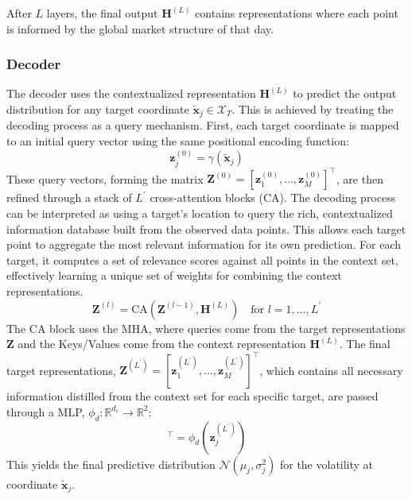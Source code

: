 \documentclass[authoryear,preprint,review,12pt]{elsarticle}
\begin{document}
After \(L\) layers, the final output \(\mathbf{H}^{(L)}\) contains representations where each point is informed by the global market structure of that day. 


\subsubsection{Decoder}
The decoder uses the contextualized representation \(\mathbf{H}^{(L)}\) to predict the output distribution for any target coordinate \(\tilde{\mathbf{x}}_j \in \mathcal{X}_T\). This is achieved by treating the decoding process as a query mechanism. First, each target coordinate is mapped to an initial query vector using the same positional encoding function:
\begin{equation}
    \mathbf{z}_j^{(0)} = \gamma(\tilde{\mathbf{x}}_j)
    \label{eq:initial_target_repr}
\end{equation}
These query vectors, forming the matrix \(\mathbf{Z}^{(0)}=\left[\mathbf{z}_1^{(0)},\dots,\mathbf{z}_M^{(0)}\right]^\intercal\), are then refined through a stack of \(L^\prime\) cross-attention blocks (\(\text{CA}\)). The decoding process can be interpreted as using a target's location to query the rich, contextualized information database built from the observed data points. This allows each target point to aggregate the most relevant information for its own prediction. For each target, it computes a set of relevance scores against all points in the context set, effectively learning a unique set of weights for combining the context representations.
\begin{equation}
    \mathbf{Z}^{(l)} = \text{CA}(\mathbf{Z}^{(l-1)}, \mathbf{H}^{(L)}) \quad \text{for } l = 1, \dots, L^\prime
    \label{eq:cross_attention}
\end{equation}
The CA block uses the MHA, where queries come from the target representations \(\mathbf{Z}\) and the Keys/Values come from the context representation \(\mathbf{H}^{(L)}\).
The final target representations, \(\mathbf{Z}^{(L^\prime)} = \left[\mathbf{z}_1^{(L^\prime)}, \dots, \mathbf{z}_{M}^{(L^\prime)}\right]^\intercal\), which contains all necessary information distilled from the context set for each specific target, are passed through a MLP, \(\phi_d: \mathbb{R}^{d_r} \to \mathbb{R}^2\):
\begin{equation}
    [\mu_j, \log\sigma_j^2]^\intercal = \phi_d(\mathbf{z}_j^{(L^\prime)})
    \label{eq:prediction_head}
\end{equation}
This yields the final predictive distribution \(\mathcal{N}(\mu_j, \sigma_j^2)\) for the volatility at coordinate \(\tilde{\mathbf{x}}_j\).
\end{document}

